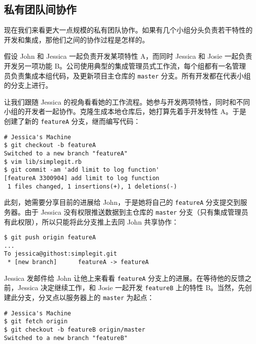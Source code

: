 \documentclass[a4paper]{book}
\begin{document}
\subsection{私有团队间协作}

现在我们来看更大一点规模的私有团队协作。如果有几个小组分头负责若干特性的开发和集成，那他们之间的协作过程是怎样的。

假设 John 和 Jessica 一起负责开发某项特性 A，而同时 Jessica 和 Josie 一起负责开发另一项功能 B。公司使用典型的集成管理员式工作流，每个组都有一名管理员负责集成本组代码，及更新项目主仓库的 \texttt{master} 分支。所有开发都在代表小组的分支上进行。

让我们跟随 Jessica 的视角看看她的工作流程。她参与开发两项特性，同时和不同小组的开发者一起协作。克隆生成本地仓库后，她打算先着手开发特性 A。于是创建了新的 \texttt{featureA} 分支，继而编写代码：

\begin{shaded}\begin{verbatim}
# Jessica's Machine
$ git checkout -b featureA
Switched to a new branch "featureA"
$ vim lib/simplegit.rb
$ git commit -am 'add limit to log function'
[featureA 3300904] add limit to log function
 1 files changed, 1 insertions(+), 1 deletions(-)
\end{verbatim}\end{shaded}

此刻，她需要分享目前的进展给 John，于是她将自己的 \texttt{featureA} 分支提交到服务器。由于 Jessica 没有权限推送数据到主仓库的 \texttt{master} 分支（只有集成管理员有此权限），所以只能将此分支推上去同 John 共享协作：

\begin{shaded}\begin{verbatim}
$ git push origin featureA
...
To jessica@githost:simplegit.git
 * [new branch]      featureA -> featureA
\end{verbatim}\end{shaded}

Jessica 发邮件给 John 让他上来看看 \texttt{featureA} 分支上的进展。在等待他的反馈之前，Jessica 决定继续工作，和 Josie 一起开发 \texttt{featureB} 上的特性 B。当然，先创建此分支，分叉点以服务器上的 \texttt{master} 为起点：

\begin{shaded}\begin{verbatim}
# Jessica's Machine
$ git fetch origin
$ git checkout -b featureB origin/master
Switched to a new branch "featureB"
\end{verbatim}\end{shaded}
\end{document}
